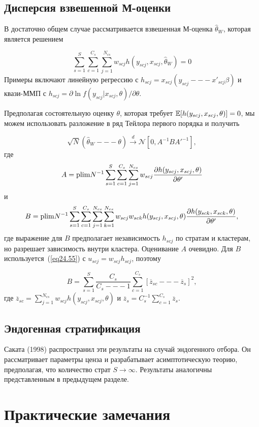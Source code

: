 \subsection*{Дисперсия взвешенной М-оценки}

В достаточно общем случае рассматривается взвешенная М-оценка $\hat \theta_W$, которая является решением

$$
\sum_{s=1}^S \sum_{c=1}^{C_s} \sum_{j=1}^{N_{cs}} w_{scj} h( y_{scj}, x_{scj}, \hat \theta_W) = 0
$$
Примеры включают линейную регрессию с $h_{scj} = x_{scj} (y_{scj} --- x'_{scj} \beta)$ и квази-ММП с $h_{scj} = \partial \ln f (y_{scj} | x_{scj}, \theta) / \partial \theta$. 

Предполагая состоятельную оценку $\theta$, которая требует $\mathbb{E}[h(y_{scj}, x_{scj}, \theta)] = 0$, мы можем использовать разложение в ряд Тейлора первого порядка и получить

$$
\sqrt{N} (\hat \theta_W --- \theta) \overset{d}{\to} \mathcal N \left[  0, A^{-1} B A'^{-1} \right],
$$
где
$$
A = \mathrm{plim } N^{-1} \sum_{s=1}^S \sum_{c=1}^{C_s} \sum_{j=1}^{N_{cs}} w_{scj} \frac{\partial h(y_{scj}, x_{scj}, \theta)}{\partial \theta'}
$$
и
$$
B = \mathrm{plim } N^{-1} \sum_{s=1}^S \sum_{c=1}^{C_s} \sum_{j=1}^{N_{cs}} \sum_{k=1}^{N_{cs}} w_{scj} w_{sck} h(y_{scj}, x_{scj}, \theta)  \frac{\partial h(y_{sck}, x_{sck}, \theta)}{\partial \theta'},
$$
где выражение для $B$ предполагает независимость $h_{scj}$ по стратам и кластерам, но разрешает зависимость внутри кластера. Оценивание $A$ очевидно. Для $B$ используется~(\ref{eq24.55}) с $u_{scj} = w_{scj} h_{scj}$, поэтому

$$
B = \sum_{s=1}^S \frac{C_s}{C_s --- 1} \sum_{c=1}^{C_s} [\overline{z}_{sc} --- \overline{z}_s]^2, 
$$
где $ \overline{z}_{sc} = \sum_{j=1}^{N_{cs}} w_{scj} h (y_{scj}, x_{scj}, \theta)$ и $\overline{z}_{s} = C_s^{-1} \sum_{c=1}^{C_s} \overline{z}_{s}$. 

\subsection*{Эндогенная стратификация}

Саката (1998) распространил эти результаты на случай эндогенного отбора. Он рассматривает параметры ценза и разрабатывает асимптотическую теорию, предполагая, что количество страт $S \to \infty$. Результаты аналогичны представленным в предыдущем разделе. 

\section{Практические замечания}

